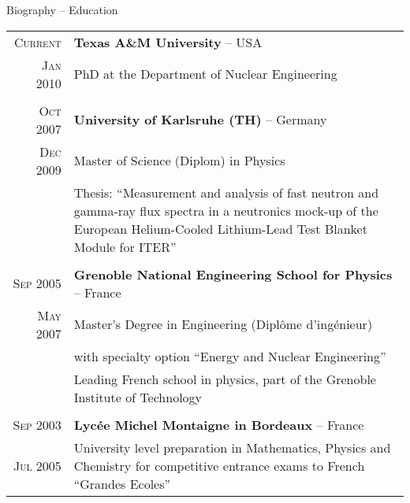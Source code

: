 \begin{frame}{Biography -- Education}

\begin{minipage}{5cm}
\scriptsize
\begin{tabular}{r|p{9.5cm}}
\textsc{Current} & \textbf{Texas A\&M University} -- USA \\
\textsc{Jan 2010} & PhD at the Department of Nuclear Engineering \\
\multicolumn{2}{c}{} \\
\textsc{Oct 2007} & \textbf{University of Karlsruhe (TH)} -- Germany \\
\textsc{Dec 2009} & Master of Science (Diplom) in Physics \\
 & \tiny Thesis: ``Measurement and analysis of fast neutron and gamma-ray flux spectra in a neutronics mock-up of the European Helium-Cooled Lithium-Lead Test Blanket Module for ITER'' \\
\multicolumn{2}{c}{} \\
\textsc{Sep 2005} & \textbf{Grenoble National Engineering School for Physics} -- France\\
\textsc{May 2007} & Master's Degree in Engineering (Dipl\^ome d'ing\'enieur) \\
& with specialty option ``Energy and Nuclear Engineering'' \\
& \tiny Leading French school in physics, part of the Grenoble Institute of Technology \\
\multicolumn{2}{c}{} \\
\textsc{Sep 2003} & \textbf{Lyc\'ee Michel Montaigne in Bordeaux} -- France \\
\textsc{Jul 2005} & \tiny University level preparation in Mathematics, Physics and Chemistry for competitive entrance exams to French ``Grandes Ecoles'' \\
\end{tabular}
\end{minipage}

\end{frame}



